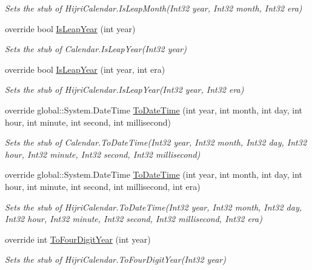 \begin{DoxyCompactItemize}
\begin{DoxyCompactList}\small\item\em Sets the stub of Hijri\-Calendar.\-Is\-Leap\-Month(\-Int32 year, Int32 month, Int32 era)\end{DoxyCompactList}\item 
override bool \hyperlink{class_system_1_1_globalization_1_1_fakes_1_1_stub_hijri_calendar_a0d07bddf0e9959554236e428042cd8f1}{Is\-Leap\-Year} (int year)
\begin{DoxyCompactList}\small\item\em Sets the stub of Calendar.\-Is\-Leap\-Year(\-Int32 year)\end{DoxyCompactList}\item 
override bool \hyperlink{class_system_1_1_globalization_1_1_fakes_1_1_stub_hijri_calendar_a61794458e244e007fad7300a7f93a638}{Is\-Leap\-Year} (int year, int era)
\begin{DoxyCompactList}\small\item\em Sets the stub of Hijri\-Calendar.\-Is\-Leap\-Year(\-Int32 year, Int32 era)\end{DoxyCompactList}\item 
override global\-::\-System.\-Date\-Time \hyperlink{class_system_1_1_globalization_1_1_fakes_1_1_stub_hijri_calendar_ad0b188ad374ae442ca5374aa26b925cb}{To\-Date\-Time} (int year, int month, int day, int hour, int minute, int second, int millisecond)
\begin{DoxyCompactList}\small\item\em Sets the stub of Calendar.\-To\-Date\-Time(\-Int32 year, Int32 month, Int32 day, Int32 hour, Int32 minute, Int32 second, Int32 millisecond)\end{DoxyCompactList}\item 
override global\-::\-System.\-Date\-Time \hyperlink{class_system_1_1_globalization_1_1_fakes_1_1_stub_hijri_calendar_a955a861ebc1b782908cf0f87ee9f3c00}{To\-Date\-Time} (int year, int month, int day, int hour, int minute, int second, int millisecond, int era)
\begin{DoxyCompactList}\small\item\em Sets the stub of Hijri\-Calendar.\-To\-Date\-Time(\-Int32 year, Int32 month, Int32 day, Int32 hour, Int32 minute, Int32 second, Int32 millisecond, Int32 era)\end{DoxyCompactList}\item 
override int \hyperlink{class_system_1_1_globalization_1_1_fakes_1_1_stub_hijri_calendar_ab474da2942e1a66fece3d3c88f584f9b}{To\-Four\-Digit\-Year} (int year)
\begin{DoxyCompactList}\small\item\em Sets the stub of Hijri\-Calendar.\-To\-Four\-Digit\-Year(\-Int32 year)\end{DoxyCompactList}\end{DoxyCompactItemize}
